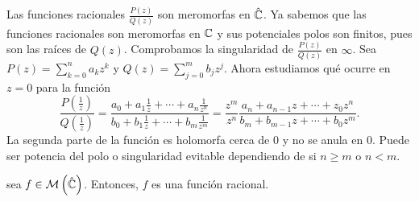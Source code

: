 \begin{eg}
Las funciones racionales $\displaystyle \frac{P\left(z\right)}{Q\left(z\right)} $ son meromorfas en $\displaystyle \hat{\mathbb{C}} $. Ya sabemos que las funciones racionales son meromorfas en $\displaystyle \mathbb{C} $ y sus potenciales polos son finitos, pues son las raíces de $\displaystyle Q\left(z\right) $. Comprobamos la singularidad de $\displaystyle \frac{P\left(z\right)}{Q\left(z\right)} $ en $\displaystyle \infty  $. Sea $\displaystyle P\left(z\right)=\sum^{n}_{k = 0}a_{k}z^{k} $ y $\displaystyle Q\left(z\right)=\sum^{m}_{j = 0}b_{j}z^{j} $. Ahora estudiamos qué ocurre en $\displaystyle z = 0 $ para la función 
\[\frac{P\left(\frac{1}{z}\right)}{Q\left(\frac{1}{z}\right)} = \frac{a_{0} + a_{1}\frac{1}{z}+ \cdots + a_{n}\frac{1}{z^{n}}}{b_{0} + b_{1}\frac{1}{z}+ \cdots + b_{m}\frac{1}{z^{m}}}  = \frac{z^{m}}{z^{n}}\frac{a_{n}+a_{n-1}z+ \cdots + z_{0}z^{n}}{b_{m}+b_{m -1}z + \cdots + b_{0}z^{m}}.\]
La segunda parte de la función es holomorfa cerca de 0 y no se anula en 0. Puede ser potencia del polo o singularidad evitable dependiendo de si $\displaystyle n \geq m $ o $\displaystyle n < m $. 
\end{eg}
\begin{theorem}
sea $\displaystyle f \in \mathcal{M}\left(\hat{\mathbb{C}}\right) $. Entonces, $\displaystyle f $ es una función racional.
\end{theorem}

